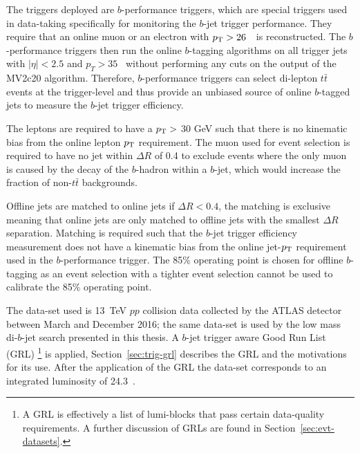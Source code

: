 The triggers deployed are $b$-performance triggers, which are special triggers used in data-taking specifically for monitoring the $b$-jet trigger performance.
They require that an online muon or an electron with $p_{\mathrm{T}}{} > 26$~\GeV~is reconstructed.
The $b$-performance triggers then run the online $b$-tagging algorithms on all trigger jets with $|\eta|<2.5$ and
\mbox{$p_{T}>35$~\GeV} without performing any cuts on the output of the MV2c20 algorithm.
Therefore, $b$-performance triggers can select  di-lepton $t\bar{t}$ events at the trigger-level
and thus provide an unbiased source of online $b$-tagged jets to measure the $b$-jet trigger efficiency.

The leptons are required to have a $p_{\mathrm{T}} >$ 30 GeV such that there is no kinematic bias from the online lepton $p_{\mathrm{T}}$ requirement. 
The muon used for event selection is required to have no jet within  $\Delta R$ of 0.4 to exclude %
events where the only muon is caused by the decay of the $b$-hadron within a $b$-jet, which would increase the fraction of non-$t\bar{t}$ backgrounds.

Offline jets are matched to online jets if $\Delta R < 0.4$,
the matching is exclusive meaning that online jets are only matched to offline jets with the smallest $\Delta R$ separation.
Matching is required such that the $b$-jet trigger efficiency measurement does not have a kinematic bias
from the online jet-$p_{\mathrm{T}}$ requirement used in the $b$-performance trigger.
The 85\% operating point is chosen for offline $b$-tagging as an event selection with a tighter event selection
cannot be used to calibrate the 85\% operating point.






The data-set used is 13~TeV $pp$ collision data collected by the ATLAS detector between March and December 2016;
the same data-set is used by the low mass di-$b$-jet search presented in this thesis. %
A $b$-jet trigger aware Good Run List (GRL) 
\footnote{A GRL is effectively a list of lumi-blocks that pass certain data-quality requirements.
  A further discussion of GRLs are found in Section~\ref{sec:evt-datasets}.}
is applied, Section~\ref{sec:trig-grl} describes the GRL and the motivations for its use.
After the application of the GRL the data-set corresponds to an integrated luminosity of 24.3~\ifb.

